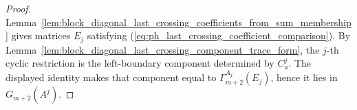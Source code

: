 \begin{proof}
    \leanok
    Lemma~\ref{lem:block_diagonal_last_crossing_coefficients_from_sum_membership}
    gives matrices $E_j$ satisfying
    (\ref{eq:ph_last_crossing_coefficient_comparison}). By
    Lemma~\ref{lem:block_diagonal_last_crossing_component_trace_form}, the
    $j$-th cyclic restriction is the left-boundary component determined by
    $C^j_a$. The displayed identity makes that component equal to
    $\Gamma_{m+2}^{A_j}(E_j)$, hence it lies in $G_{m+2}(A^j)$.
\end{proof}
